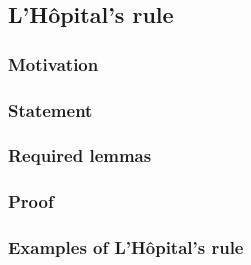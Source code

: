 \subsection{L'Hôpital's rule}
\subsubsection{Motivation}


\subsubsection{Statement}

\subsubsection{Required lemmas}

\subsubsection{Proof}

\subsubsection{Examples of L'Hôpital's rule}
